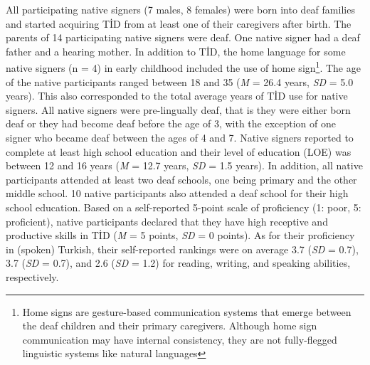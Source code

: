 \documentclass[]{elsarticle} %
\begin{document}
All participating native signers (7 males, 8 females) were born into
deaf families and started acquiring TİD from at least one of their
caregivers after birth. The parents of 14 participating native signers
were deaf. One native signer had a deaf father and a hearing mother. In
addition to TİD, the home language for some native signers (n = 4) in
early childhood included the use of home
sign\footnote{Home signs are gesture-based communication systems that emerge between the deaf children and their primary caregivers. Although home sign communication may have internal consistency, they are not fully-flegged linguistic systems like natural languages}.
The age of the native participants ranged between 18 and 35 (\emph{M} =
26.4 years, \emph{SD} = 5.0 years). This also corresponded to the total
average years of TİD use for native signers. All native signers were
pre-lingually deaf, that is they were either born deaf or they had
become deaf before the age of 3, with the exception of one signer who
became deaf between the ages of 4 and 7. Native signers reported to
complete at least high school education and their level of education
(LOE) was between 12 and 16 years (\emph{M} = 12.7 years, \emph{SD} =
1.5 years). In addition, all native participants attended at least two
deaf schools, one being primary and the other middle school. 10 native
participants also attended a deaf school for their high school
education. Based on a self-reported 5-point scale of proficiency (1:
poor, 5: proficient), native participants declared that they have high
receptive and productive skills in TİD (\emph{M} = 5 points, \emph{SD} =
0 points). As for their proficiency in (spoken) Turkish, their
self-reported rankings were on average 3.7 (\emph{SD} = 0.7), 3.7
(\emph{SD} = 0.7), and 2.6 (\emph{SD} = 1.2) for reading, writing, and
speaking abilities, respectively.
\end{document}
